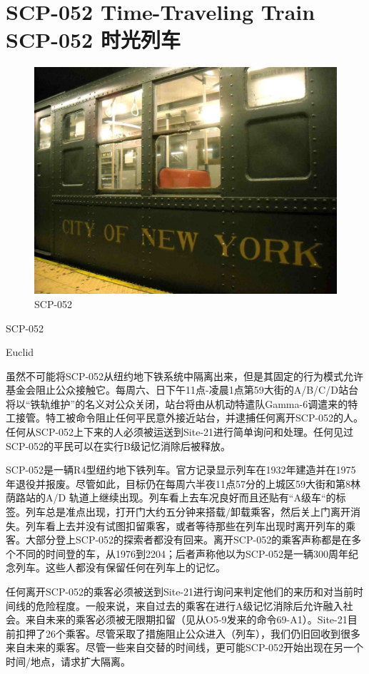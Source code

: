 \chapter[SCP-052 时光列车]{
    SCP-052 Time-Traveling Train\\
    SCP-052 时光列车
}

\label{chap:SCP-052}

\begin{figure}[H]
    \centering
    \includegraphics[width=0.5\linewidth]{images/SCP.052.jpg}
    \caption*{SCP-052}
\end{figure}

SCP-052

Euclid

虽然不可能将SCP-052从纽约地下铁系统中隔离出来，但是其固定的行为模式允许基金会阻止公众接触它。每周六、日下午11点-凌晨1点第59大街的A\slash B\slash C\slash D站台将以“铁轨维护”的名义对公众关闭，站台将由从机动特遣队Gamma-6调遣来的特工接管。特工被命令阻止任何平民意外接近站台，并逮捕任何离开SCP-052的人。任何从SCP-052上下来的人必须被运送到Site-21进行简单询问和处理。任何见过SCP-052的平民可以在实行B级记忆消除后被释放。

SCP-052是一辆R4型纽约地下铁列车。官方记录显示列车在1932年建造并在1975年退役并报废。尽管如此，目标仍在每周六半夜11点57分的上城区59大街和第8林荫路站的A\slash D 轨道上继续出现。列车看上去车况良好而且还贴有“A级车“的标签。列车总是准点出现，打开门大约五分钟来搭载\slash 卸载乘客，然后关上门离开消失。列车看上去并没有试图扣留乘客，或者等待那些在列车出现时离开列车的乘客。大部分登上SCP-052的探索者都没有回来。离开SCP-052的乘客声称都是在多个不同的时间登的车，从1976到2204；后者声称他以为SCP-052是一辆300周年纪念列车。这些人都没有保留任何在列车上的记忆。

任何离开SCP-052的乘客必须被送到Site-21进行询问来判定他们的来历和对当前时间线的危险程度。一般来说，来自过去的乘客在进行A级记忆消除后允许融入社会。来自未来的乘客必须被无限期扣留（见从O5-9发来的命令69-A1）。Site-21目前扣押了26个乘客。尽管采取了措施阻止公众进入（列车），我们仍旧回收到很多来自未来的乘客。尽管一些来自交替的时间线，更可能SCP-052开始出现在另一个时间\slash 地点，请求扩大隔离。

